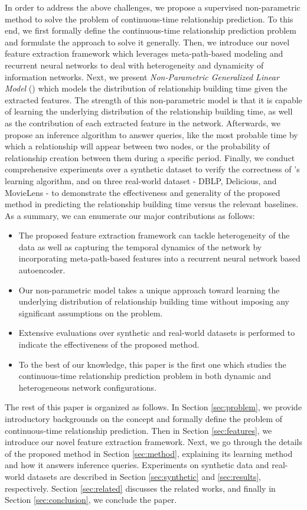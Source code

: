 In order to address the above challenges, we propose a supervised non-parametric method to solve the problem of continuous-time relationship prediction. To this end, we first formally define the continuous-time relationship prediction problem and formulate the approach to solve it generally. Then, we introduce our novel feature extraction framework which leverages meta-path-based modeling and recurrent neural networks to deal with heterogeneity and dynamicity of information networks. Next, we present \emph{Non-Parametric Generalized Linear Model} (\npglm) which models the distribution of relationship building time given the extracted features. The strength of this non-parametric model is that it is capable of learning the underlying distribution of the relationship building time, as well as the contribution of each extracted feature in the network. Afterwards, we propose an inference algorithm to answer queries, like the most probable time by which a relationship will appear between two nodes, or the probability of relationship creation between them during a specific period. Finally, we conduct comprehensive experiments over a synthetic dataset to verify the correctness of \npglm's learning algorithm, and on three real-world dataset - DBLP, Delicious, and MovieLens - to demonstrate the effectiveness and generality of the proposed method in predicting the relationship building time versus the relevant baselines. As a summary, we can enumerate our major contributions as follows:

\begin{itemize}
\item The proposed feature extraction framework can tackle heterogeneity of the data as well as capturing the temporal dynamics of the network by incorporating meta-path-based features into a recurrent neural network based autoencoder.
\item Our non-parametric model takes a unique approach toward learning the underlying distribution of relationship building time without imposing any significant assumptions on the problem.
\item Extensive evaluations over synthetic and real-world datasets is performed to indicate the effectiveness of the proposed method. 
\item To the best of our knowledge, this paper is the first one which studies the continuous-time relationship prediction problem in both dynamic and heterogeneous network configurations.
\end{itemize}

The rest of this paper is organized as follows. In Section \ref{sec:problem}, we provide introductory backgrounds on the concept and formally define the problem of continuous-time relationship prediction. Then in Section \ref{sec:features}, we introduce our novel feature extraction framework. Next, we go through the details of the proposed \npglm method in Section \ref{sec:method}, explaining its learning method and how it answers inference queries. Experiments on synthetic data and real-world datasets are described in Section \ref{sec:synthetic} and \ref{sec:results}, respectively. Section \ref{sec:related} discusses the related works, and finally in Section \ref{sec:conclusion}, we conclude the paper.
